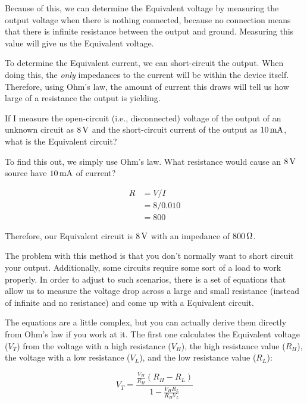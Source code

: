 Because of this, we can determine the \thev Equivalent voltage by measuring the output voltage when there is nothing connected, because no connection means that there is infinite resistance between the output and ground.
Measuring this value will give us the \thev Equivalent voltage.

To determine the \thev Equivalent current, we can short-circuit the output.
When doing this, the \emph{only} impedances to the current will be within the device itself.
Therefore, using Ohm's law, the amount of current this draws will tell us how large of a resistance the output is yielding.

\begin{exampleprob}
If I measure the open-circuit (i.e., disconnected) voltage of the output of an unknown circuit as $8\,\si{\volt}$ and the short-circuit current of the output as $10\,\si{\milli\ampere}$, what is the \thev Equivalent circuit?

To find this out, we simply use Ohm's law.
What resistance would cause an $8\,\si{\volt}$ source have $10\,\si{\milli\ampere}$ of current?

\begin{align*}
R &= V / I \\
  &= 8 / 0.010 \\
  &= 800
\end{align*}

Therefore, our \thev Equivalent circuit is $8\,\si{\volt}$ with an impedance of $800\,\si{\ohm}$.
\end{exampleprob}

The problem with this method is that you don't normally want to short circuit your output.  
Additionally, some circuits require some sort of a load to work properly.
In order to adjust to such scenarios, there is a set of equations that allow us to measure the voltage drop across a large and small resistance (instead of infinite and no resistance) and come up with a \thev Equivalent circuit.

The equations are a little complex, but you can actually derive them directly from Ohm's law if you work at it.
The first one calculates the \thev Equivalent voltage ($V_T$) from the voltage with a high resistance ($V_H$), the high resistance value ($R_H$), the voltage with a low resistance ($V_L$), and the low resistance value ($R_L$):

\begin{equation}
\label{eqThevEqVoltExp}
V_T = \frac{\frac{V_H}{R_H}(R_H - R_L)}{1 - \frac{V_H R_L}{R_H V_L}}
\end{equation}

